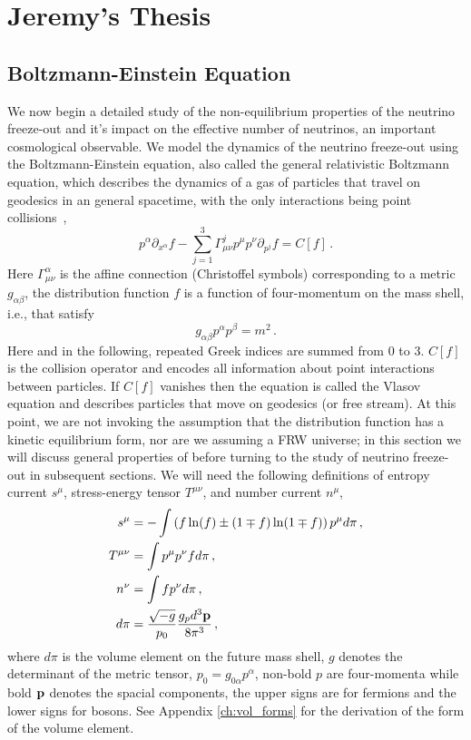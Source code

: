 \section{Jeremy's Thesis}\label{part3}
\subsection{Boltzmann-Einstein Equation}
We now begin a detailed study of the non-equilibrium properties of the neutrino freeze-out and it's impact on the effective number of neutrinos, an important cosmological observable. We model the dynamics of the neutrino freeze-out using the Boltzmann-Einstein equation, also called the general relativistic Boltzmann equation, which describes the dynamics of a gas of particles that travel on geodesics in an general spacetime, with the only interactions being point collisions~\cite{Andreasson:2011ng,cercignani,Choquet-Bruhat:2009xil,ehlers},
\begin{equation}\label{boltzmann_einstein}
p^\alpha\partial_{x^\alpha}f-\sum_{j=1}^3\Gamma^j_{\mu\nu}p^\mu p^\nu\partial_{p^j}f=C[f]\,.
\end{equation}
Here $ \Gamma^\alpha_{\mu\nu}$ is the affine connection (Christoffel symbols) corresponding to a metric $g_{\alpha\beta}$,   the distribution function $f$ is a function of four-momentum on the mass shell, i.e., that satisfy
 \begin{equation}
g_{\alpha\beta}p^\alpha p^\beta=m^2\,.
\end{equation}
Here and in the following,  repeated Greek indices are summed from $0$ to $3$.  $C[f]$ is the collision operator and encodes all information about point interactions between particles.  If $C[f]$ vanishes then the equation is called the Vlasov equation and describes particles that move on geodesics (or free stream).  At this point, we are  not invoking the assumption that the distribution function has a kinetic equilibrium form, nor are we assuming a FRW universe; in this section we will discuss  general properties of  before turning to the study of neutrino freeze-out in subsequent sections.   We will need the following definitions of entropy current $s^\mu$, stress-energy tensor ${T}^{\mu\nu}$, and number current $n^\mu$,
\begin{align}
\label{smdef} s^\mu&=-\int \left(f\ln(f)\pm(1\mp f)\ln(1\mp f)\right)p^\mu d\pi\,,\\
\label{Tmndef}{T}^{\mu\nu}&=\int p^\mu p^\nu f d\pi\,,\\
\label{nmdef} n^\nu&=\int f p^\nu d\pi\,,\\
d\pi&=\frac{\sqrt{-g}}{p_0}\frac{g_pd^3{\bf p}}{8\pi^3}\,,
\end{align}
where $d\pi$ is the volume element on the future mass shell, $g$ denotes the determinant of the metric tensor, $p_0=g_{0\alpha} p^\alpha$, non-bold $p$ are four-momenta while bold ${\bf p}$ denotes the spacial components, the upper signs are for fermions and the lower signs for bosons. See Appendix \ref{ch:vol_forms} for the derivation of the form of the volume element.
